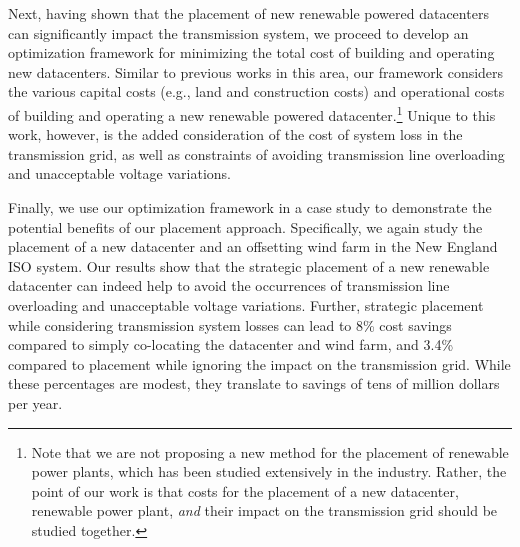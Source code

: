 
Next, having shown that the placement of new renewable powered datacenters can significantly impact the transmission system, we proceed to develop an optimization framework for minimizing the total cost of building and operating new datacenters.  Similar to previous works in this area, our framework considers the various capital costs (e.g., land and construction costs) and operational costs of building and operating a new renewable powered datacenter.\footnote{Note that we are not proposing a new method for the placement of renewable power plants, which has been studied extensively in the industry.  Rather, the point of our work is that costs for the placement of a new datacenter, renewable power plant, {\em and} their impact on the transmission grid should be studied together.}
  Unique to this work, however, is the added consideration of the cost of system loss in the transmission grid, as well as constraints of avoiding transmission line overloading and unacceptable voltage variations.

Finally, we use our optimization framework in a case study to demonstrate the potential benefits of our placement approach.  Specifically, we again study the placement of a new datacenter and an offsetting wind farm in the New England ISO system.  Our results show that the strategic placement of a new renewable datacenter can indeed help to avoid the occurrences of transmission line overloading and unacceptable voltage variations.  Further, strategic placement while considering transmission system losses can lead to 8\% cost savings compared to simply co-locating the datacenter and wind farm, and 3.4\% compared to placement while ignoring the impact on the transmission grid.  While these percentages are modest, they translate to savings of tens of million dollars per year.

